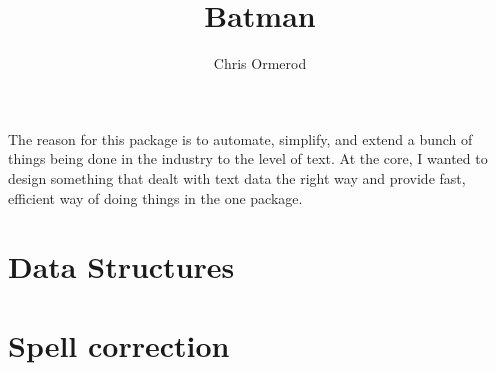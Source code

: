 \documentclass{amsproc}
\begin{document}
\title{Batman}
\author{Chris Ormerod}
\maketitle

The reason for this package is to automate, simplify, and extend a bunch of things being done in the industry to the level of text. At the core, I wanted to design something that dealt with text data the right way and provide fast, efficient way of doing things in the one package. 

\section{Data Structures}


\section{Spell correction}
\end{document}
